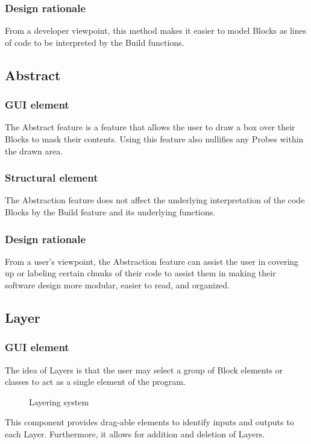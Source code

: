 \documentclass[journal,10pt,onecolumn,compsoc]{IEEEtran} \usepackage[margin=1.0in]{geometry} \usepackage{pdfpages}
\begin{document}
\subsubsection{Design rationale}
\noindent From a developer viewpoint, this method makes it easier to model Blocks as lines of code to be interpreted by the Build functions.
\subsection{Abstract}
\subsubsection{GUI element}
\noindent The Abstract feature is a feature that allows the user to draw a box over their Blocks to mask their contents. 
Using this feature also nullifies any Probes within the drawn area.
\subsubsection{Structural element}
\noindent The Abstraction feature does not affect the underlying interpretation of the code Blocks by the Build feature and its underlying functions.
\subsubsection{Design rationale}
\noindent From a user's viewpoint, the Abstraction feature can assist the user in covering up or labeling certain chunks of their code to assist them in making their software design more modular, easier to read, and organized.
\subsection{Layer}
\subsubsection{GUI element}
\noindent The idea of Layers is that the user may select a group of Block elements or classes to act as a single element of the program.
\begin{figure}[H]
\caption{Layering system}
\label{fig:inLayer}
\end{figure}
\noindent This component provides drag-able elements to identify inputs and outputs to each Layer. 
Furthermore, it allows for addition and deletion of Layers.
\end{document}
